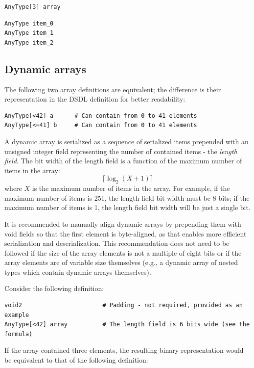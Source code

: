 \begin{verbatim}
AnyType[3] array
\end{verbatim}

\begin{verbatim}
AnyType item_0
AnyType item_1
AnyType item_2
\end{verbatim}

\subsection{Dynamic arrays}

The following two array definitions are equivalent;
the difference is their representation in the DSDL definition for better readability:
\begin{verbatim}
AnyType[<42] a      # Can contain from 0 to 41 elements
AnyType[<=41] b     # Can contain from 0 to 41 elements
\end{verbatim}

A dynamic array is serialized as a sequence of serialized items prepended with an unsigned
integer field representing the number of contained items - the \emph{length field}.
The bit width of the length field is a function of the maximum number of items in the array:
$$\lceil{}\log_2 (X + 1)\rceil{}$$
where $X$ is the maximum number of items in the array.
For example, if the maximum number of items is 251, the length field bit width must be 8 bits;
if the maximum number of items is 1, the length field bit width will be just a single bit.

It is recommended to manually align dynamic arrays by prepending them with void fields
so that the first element is byte-aligned, as that enables more efficient serialization and
deserialization.
This recommendation does not need to be followed if the size of the array elements is not
a multiple of eight bits or if the array elements are of variable size themselves
(e.g., a dynamic array of nested types which contain dynamic arrays themselves).

Consider the following definition:

\begin{verbatim}
void2                       # Padding - not required, provided as an example
AnyType[<42] array          # The length field is 6 bits wide (see the formula)
\end{verbatim}

If the array contained three elements,
the resulting binary representation would be equivalent to that of the following definition:

